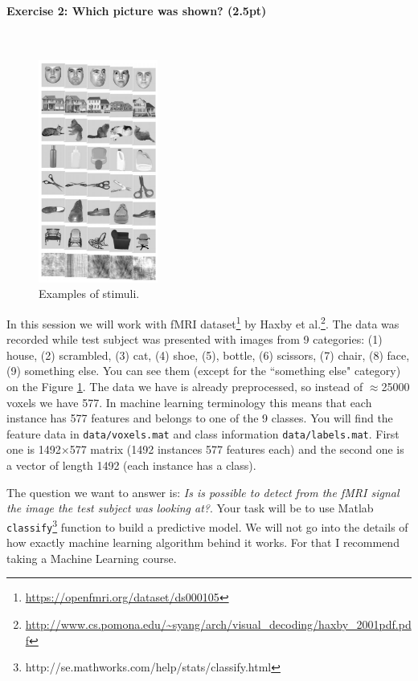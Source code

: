 \documentclass[a4paper,11pt]{article}
\newenvironment{exercise}[3]{\paragraph{Exercise #1: #2 (#3pt)}\ \\}{
\medskip}
\begin{document}
%
%
\begin{exercise}{2}{Which picture was shown?}{2.5}
\begin{figure}
	\centering
	\vspace{-45pt}
	\includegraphics[width=0.35\textwidth]{stimuli.png}
	\caption{Examples of stimuli.}
	\label{fig:stimuli}
	\vspace{-20pt}
\end{figure}
In this session we will work with fMRI dataset\footnote{\url{https://openfmri.org/dataset/ds000105}} by Haxby et al.\footnote{\url{http://www.cs.pomona.edu/~syang/arch/visual_decoding/haxby_2001pdf.pdf}}. The data was recorded while test subject was presented with images from 9 categories: (1) house,  (2) scrambled, (3) cat, (4) shoe, (5), bottle, (6) scissors, (7) chair, (8) face, (9) something else. You can see them (except for the ``something else" category) on the Figure \ref{fig:stimuli}. The data we have is already preprocessed, so instead of $\approx$25000 voxels we have 577. In machine learning terminology this means that each instance has 577 features and belongs to one of the 9 classes. You will find the feature data in \texttt{data/voxels.mat} and class information \texttt{data/labels.mat}. First one is 1492$\times$577 matrix (1492 instances 577 features each) and the second one is a vector of length 1492 (each instance has a class).

The question we want to answer is: \emph{Is is possible to detect from the fMRI signal the image the test subject was looking at?}. Your task will be to use Matlab \texttt{classify}\footnote{http://se.mathworks.com/help/stats/classify.html} function to build a predictive model. We will not go into the details of how exactly machine learning algorithm behind it works. For that I recommend taking a Machine Learning course.


\end{exercise}
\end{document}
